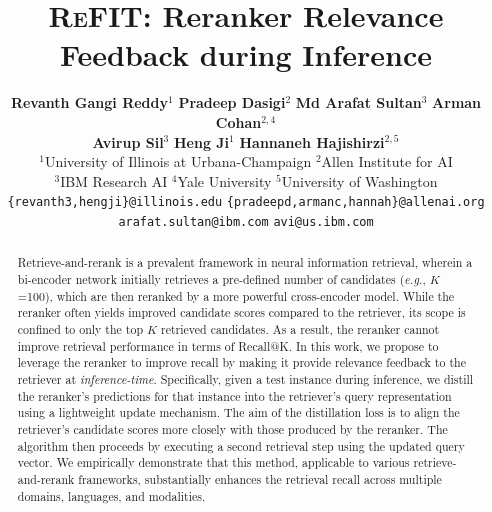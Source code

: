 \documentclass[11pt]{article} %
\newcommand{\eg}{\textit{e.g.}}
\begin{document}
\title{\textsc{ReFIT}: Reranker Relevance Feedback during Inference}
\pagestyle{plain}
\author{\textbf{Revanth Gangi Reddy}$^1$ \hspace{0.2em} \textbf{Pradeep Dasigi}$^2$ \hspace{0.2em} \textbf{Md Arafat Sultan}$^3$ \hspace{0.2em} \textbf{Arman Cohan}$^{2,4}$ \\ \textbf{Avirup Sil}$^3$ \hspace{0.2em} \textbf{Heng Ji}$^1$ \hspace{0.2em} \textbf{Hannaneh Hajishirzi}$^{2,5}$ \\
$^1$University of Illinois at Urbana-Champaign \hspace{0.5em}  $^2$Allen Institute for AI \\ $^3$IBM Research AI \hspace{0.5em} $^4$Yale University \hspace{0.2em} $^5$University of Washington\\
  \texttt{\{revanth3,hengji\}@illinois.edu} \hspace{0.4em} \texttt{\{pradeepd,armanc,hannah\}@allenai.org} \\
  \texttt{arafat.sultan@ibm.com}\hspace{0.4em} \texttt{avi@us.ibm.com}
  }
\maketitle

\begin{abstract}

Retrieve-and-rerank is a prevalent framework in neural information retrieval, wherein a bi-encoder network initially retrieves a pre-defined number of candidates (\eg{}, $K$=100), which are then reranked by a more powerful cross-encoder model. While the reranker often yields improved candidate scores compared to the retriever, its scope is confined to only the top $K$ retrieved candidates. As a result, the reranker cannot improve retrieval performance in terms of Recall@K. In this work, we propose to leverage the reranker to improve recall by making it provide relevance feedback to the retriever at \textit{inference-time}. Specifically, given a test instance during inference, we distill the reranker's predictions for that instance into the retriever's query representation using a lightweight update mechanism. The aim of the distillation loss is to align the retriever's candidate scores more closely with those produced by the reranker. The algorithm then proceeds by executing a second retrieval step using the updated query vector. We empirically demonstrate that this method, applicable to various retrieve-and-rerank frameworks, substantially enhances the retrieval recall across multiple domains, languages, and modalities.

\end{abstract}
\end{document}
